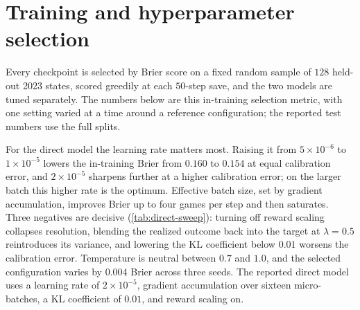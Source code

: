 \section{Training and hyperparameter selection}
\label{app:hparams}

Every checkpoint is selected by Brier score on a fixed random sample of $128$ held-out 2023 states,
scored greedily at each $50$-step save, and the two models are tuned separately. The numbers below
are this in-training selection metric, with one setting varied at a time around a reference
configuration; the reported test numbers use the full splits.

For the direct model the learning rate matters most. Raising it from $5\times10^{-6}$ to
$1\times10^{-5}$ lowers the in-training Brier from $0.160$ to $0.154$ at equal calibration error, and
$2\times10^{-5}$ sharpens further at a higher calibration error; on the larger batch this higher rate
is the optimum. Effective batch size, set by gradient accumulation, improves Brier up to four games per
step and then saturates. Three negatives are decisive (\cref{tab:direct-sweep}): turning off reward
scaling collapses resolution, blending the realized outcome back into the target at $\lambda=0.5$
reintroduces its variance, and lowering the KL coefficient below $0.01$ worsens the calibration
error. Temperature is neutral between $0.7$ and $1.0$, and the selected configuration varies by
$0.004$ Brier across three seeds. The reported direct model uses a learning rate of $2\times10^{-5}$,
gradient accumulation over sixteen micro-batches, a KL coefficient of $0.01$, and reward scaling on.

